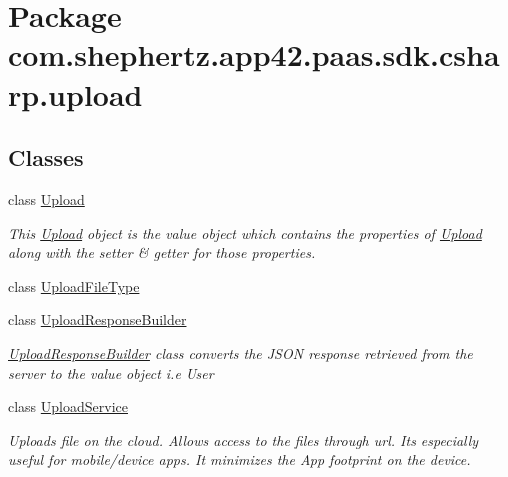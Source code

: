 \hypertarget{namespacecom_1_1shephertz_1_1app42_1_1paas_1_1sdk_1_1csharp_1_1upload}{\section{Package com.\+shephertz.\+app42.\+paas.\+sdk.\+csharp.\+upload}
\label{namespacecom_1_1shephertz_1_1app42_1_1paas_1_1sdk_1_1csharp_1_1upload}
}
\subsection*{Classes}
\begin{DoxyCompactItemize}
\item 
class \hyperlink{classcom_1_1shephertz_1_1app42_1_1paas_1_1sdk_1_1csharp_1_1upload_1_1_upload}{Upload}
\begin{DoxyCompactList}\small\item\em This \hyperlink{classcom_1_1shephertz_1_1app42_1_1paas_1_1sdk_1_1csharp_1_1upload_1_1_upload}{Upload} object is the value object which contains the properties of \hyperlink{classcom_1_1shephertz_1_1app42_1_1paas_1_1sdk_1_1csharp_1_1upload_1_1_upload}{Upload} along with the setter \& getter for those properties. \end{DoxyCompactList}\item 
class \hyperlink{classcom_1_1shephertz_1_1app42_1_1paas_1_1sdk_1_1csharp_1_1upload_1_1_upload_file_type}{Upload\+File\+Type}
\item 
class \hyperlink{classcom_1_1shephertz_1_1app42_1_1paas_1_1sdk_1_1csharp_1_1upload_1_1_upload_response_builder}{Upload\+Response\+Builder}
\begin{DoxyCompactList}\small\item\em \hyperlink{classcom_1_1shephertz_1_1app42_1_1paas_1_1sdk_1_1csharp_1_1upload_1_1_upload_response_builder}{Upload\+Response\+Builder} class converts the J\+S\+O\+N response retrieved from the server to the value object i.\+e User \end{DoxyCompactList}\item 
class \hyperlink{classcom_1_1shephertz_1_1app42_1_1paas_1_1sdk_1_1csharp_1_1upload_1_1_upload_service}{Upload\+Service}
\begin{DoxyCompactList}\small\item\em Uploads file on the cloud. Allows access to the files through url. Its especially useful for mobile/device apps. It minimizes the App footprint on the device. \end{DoxyCompactList}\end{DoxyCompactItemize}
